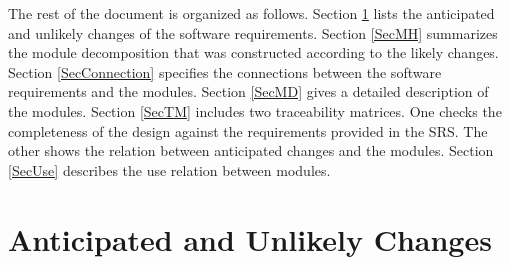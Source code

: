\documentclass[12pt, titlepage]{article}
\begin{document}
\noindent The rest of the document is organized as follows. Section
\ref{SecChange} lists the anticipated and unlikely changes of the software
requirements. Section \ref{SecMH} summarizes the module decomposition that
was constructed according to the likely changes. Section \ref{SecConnection}
specifies the connections between the software requirements and the
modules. Section \ref{SecMD} gives a detailed description of the
modules. Section \ref{SecTM} includes two traceability matrices. One checks
the completeness of the design against the requirements provided in the SRS. The
other shows the relation between anticipated changes and the modules. Section
\ref{SecUse} describes the use relation between modules.




\section{Anticipated and Unlikely Changes} \label{SecChange}
\end{document}
